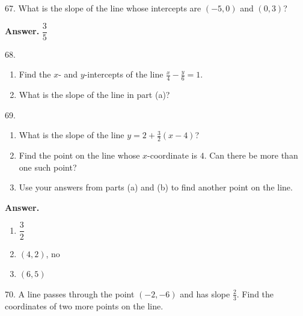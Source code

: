 \documentclass[10pt,]{book}
\theoremstyle{plain}
\theoremstyle{definition}
\theoremstyle{definition}
\theoremstyle{definition}
\theoremstyle{definition}
\numberwithin{equation}{part}
\begin{document}
\begin{exerciselist}
\begin{exercisegroup}
%
\end{exercisegroup}
\par\smallskip\noindent
\item[67.]\hypertarget{exercise-463}{}What is the slope of the line whose intercepts are \((-5, 0)\) and \((0, 3)\)?%
\par\smallskip
\par\smallskip
\noindent\textbf{Answer.}\hypertarget{answer-256}{}\quad
\(\dfrac{3}{5} \)%
\item[68.]\hypertarget{exercise-464}{}\leavevmode%
\begin{enumerate}[label=*\alph**]
\item\hypertarget{li-1639}{}Find the \(x\)- and \(y\)-intercepts of the line \(\frac{x}{4}- \frac{y}{6}= 1\).%
\item\hypertarget{li-1640}{}What is the slope of the line in part (a)?%
\end{enumerate}
%
\par\smallskip
\item[69.]\hypertarget{exercise-465}{}\leavevmode%
\begin{enumerate}[label=*\alph**]
\item\hypertarget{li-1641}{}What is the slope of the line \(y = 2 + \frac{3}{2}(x - 4)\)?%
\item\hypertarget{li-1642}{}Find the point on the line whose \(x\)-coordinate is \(4\). Can there be more than one such point?%
\item\hypertarget{li-1643}{}Use your answers from parts (a) and (b) to find another point on the line.%
\end{enumerate}
%
\par\smallskip
\par\smallskip
\noindent\textbf{Answer.}\hypertarget{answer-257}{}\quad
\leavevmode%
\begin{multicols}{3}
\begin{enumerate}[label=*\alph**]
\item\hypertarget{li-1644}{}\(\dfrac{3}{2} \)%
\item\hypertarget{li-1645}{}\((4,2)\), no%
\item\hypertarget{li-1646}{}\((6,5)\)%
\end{enumerate}
\end{multicols}
%
\item[70.]\hypertarget{exercise-466}{}A line passes through the point \((-2, -6)\) and has slope \(\frac{2}{3} \). Find the coordinates of two more points on the line.%
\par\smallskip

\end{exerciselist}
\end{document}
